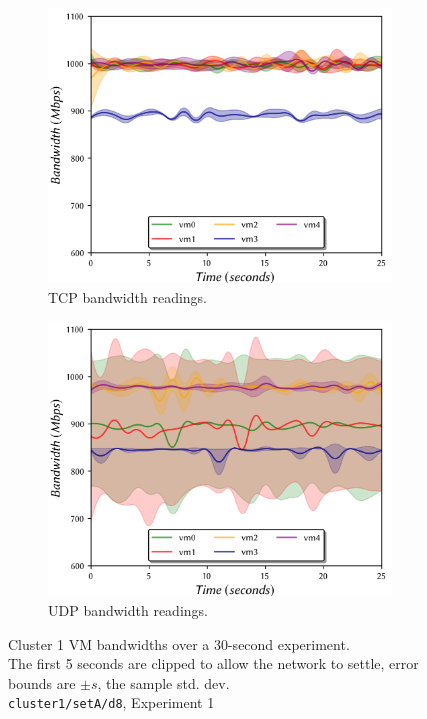 \documentclass[a4paper,10pt]{article}
\begin{document}
\begin{figure}
\centering
\begin{subfigure}{.49\textwidth}
  \centering
  \includegraphics[width=\hsize]{figs/cluster1/setA/vis-3-1.png}
  \caption{TCP bandwidth readings.}
  \label{fig:bw-1:a}
\end{subfigure}%
\hfill%
\begin{subfigure}{.49\textwidth}
  \centering
  \includegraphics[width=\hsize]{figs/cluster1/setA/vis-3-2.png}
  \caption{UDP bandwidth readings.}
  \label{fig:bw-1:b}
\end{subfigure}%
\caption{\centering{} Cluster 1 VM bandwidths over a 30-second experiment. \\ The first 5 seconds are clipped to allow the network to settle, error bounds are $\pm s$, the sample std. dev. \\ \texttt{cluster1/setA/d8}, Experiment 1 }
\label{fig:bw-1}
\end{figure}
\end{document}
